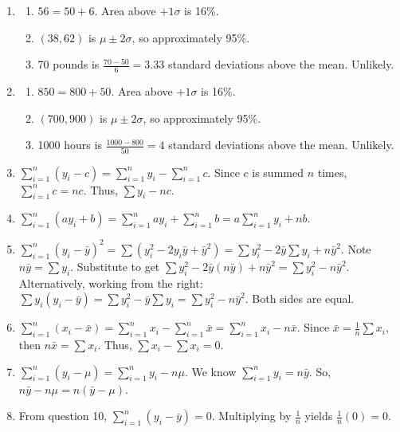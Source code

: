 \documentclass[11pt]{article}
\begin{document}
\begin{enumerate}
\item 
\begin{enumerate}
    \item $56 = 50 + 6$. Area above $+1\sigma$ is 16\%.
    \item $(38, 62)$ is $\mu \pm 2\sigma$, so approximately 95\%.
    \item 70 pounds is $\frac{70 - 50}{6} = 3.33$ standard deviations above the mean. Unlikely.
\end{enumerate}

\item 
\begin{enumerate}
    \item $850 = 800 + 50$. Area above $+1\sigma$ is 16\%.
    \item $(700, 900)$ is $\mu \pm 2\sigma$, so approximately 95\%.
    \item 1000 hours is $\frac{1000 - 800}{50} = 4$ standard deviations above the mean. Unlikely.
\end{enumerate}

\item 
$\sum_{i=1}^{n} (y_i - c) = \sum_{i=1}^{n} y_i - \sum_{i=1}^{n} c$. Since $c$ is summed $n$ times, $\sum_{i=1}^{n} c = nc$. Thus, $\sum y_i - nc$.

\item 
$\sum_{i=1}^{n} (ay_i + b) = \sum_{i=1}^{n} ay_i + \sum_{i=1}^{n} b = a\sum_{i=1}^{n} y_i + nb$.

\item 
$\sum_{i=1}^{n} (y_i - \bar{y})^2 = \sum (y_i^2 - 2y_i\bar{y} + \bar{y}^2) = \sum y_i^2 - 2\bar{y}\sum y_i + n\bar{y}^2$. 
Note $n\bar{y} = \sum y_i$. Substitute to get $\sum y_i^2 - 2\bar{y}(n\bar{y}) + n\bar{y}^2 = \sum y_i^2 - n\bar{y}^2$. 
Alternatively, working from the right: $\sum y_i(y_i - \bar{y}) = \sum y_i^2 - \bar{y}\sum y_i = \sum y_i^2 - n\bar{y}^2$. Both sides are equal.

\item 
$\sum_{i=1}^{n} (x_i - \bar{x}) = \sum_{i=1}^{n} x_i - \sum_{i=1}^{n} \bar{x} = \sum_{i=1}^{n} x_i - n\bar{x}$. Since $\bar{x} = \frac{1}{n}\sum x_i$, then $n\bar{x} = \sum x_i$. Thus, $\sum x_i - \sum x_i = 0$.

\item 
$\sum_{i=1}^{n} (y_i - \mu) = \sum_{i=1}^{n} y_i - n\mu$. We know $\sum_{i=1}^{n} y_i = n\bar{y}$. So, $n\bar{y} - n\mu = n(\bar{y} - \mu)$.

\item 
From question 10, $\sum_{i=1}^{n} (y_i - \bar{y}) = 0$. Multiplying by $\frac{1}{n}$ yields $\frac{1}{n}(0) = 0$.


\end{enumerate}
\end{document}
